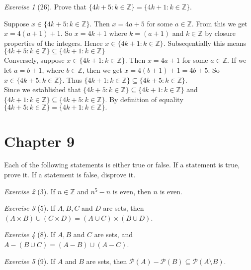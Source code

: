 \documentclass[12pt]{amsart}
\makeatletter
\theoremstyle{remark}
\newtheorem*{exercise}{Exercise}%
\def\ZZ{\ensuremath{\mathbb Z}}
\newcommand{\mc}[1]{\ensuremath{\mathcal{#1}}} %
\renewenvironment{proof}[1][\proofname]{\par\doublespacing
  \pushQED{\qed}%
  \normalfont \topsep6\p@\@plus6\p@\relax
  \list{}{%
    \settowidth{\leftmargin}{\itshape\proofname:\hskip\labelsep}%
    \setlength{\labelwidth}{0pt}%
    \setlength{\itemindent}{-\leftmargin}%
  }%
  \item[\hskip\labelsep\itshape#1\@addpunct{:}]\ignorespaces
}{%
  \popQED\endlist\@endpefalse
  \singlespacing
}
\theoremstyle{mycomment}
\makeatother
\begin{document}
\begin{exercise}[26] Prove that $\{4k+5:k\in\ZZ\}=\{4k+1:k\in\ZZ\}$.
\begin{proof}%
Suppose $x \in \{4k + 5: k \in \ZZ\}$. Then $x = 4a + 5$ for some $a \in \ZZ$. From this we get $x = 4(a + 1) + 1$. So $x = 4k + 1$ where $k = (a + 1)$ and $k \in \ZZ$ by closure properties of the integers. Hence $x \in \{4k+1:k\in\ZZ\}$. Subseqentially this means $\{4k + 5:k \in \ZZ\} \subseteq \{4k+1:k\in\ZZ\}$ \\
Conversely, suppose $x \in \{4k+1:k\in\ZZ\}$. Then $x = 4a + 1$ for some $a \in \ZZ$. If we let $a = b+1$, where $b \in \ZZ$, then we get $x = 4(b+1) + 1 = 4b + 5$. So $x \in \{4k+5:k\in\ZZ\}$. Thus $\{4k+1:k\in\ZZ\} \subseteq \{4k+5:k\in\ZZ\}$. \\
Since we established that $\{4k+5:k\in\ZZ\} \subseteq \{4k+1:k\in\ZZ\}$ and $\{4k + 1: k \in \ZZ\} \subseteq \{4k+5: k \in \ZZ \}$. By definition of equality $\{4k+5:k\in\ZZ\}=\{4k+1:k\in\ZZ\}.$
\end{proof}
\end{exercise}
\section*{Chapter 9}

Each of the following statements is either true or false. If a statement is true, prove
it. If a statement is false, disprove it. 
\begin{exercise}[3] If $n\in \ZZ$ and $n^{5}-n$ is even, then $n$ is even.
\begin{proof}%

\end{proof}
\end{exercise}

\begin{exercise}[5] If $A, B, C$ and $D$ are sets, then $(A\times B)\cup(C\times D)=(A\cup C)\times (B\cup D)$.
\begin{proof}%
\end{proof}
\end{exercise}

\begin{exercise}[8] If $A, B$ and $C$ are sets, and $A-(B\cup C)=(A-B)\cup (A-C)$.
\begin{proof}%
\end{proof}
\end{exercise}

\begin{exercise}[9] If $A$ and $B$ are sets, then $\mc P(A)-\mc P(B)\subseteq \mc P(A\setminus B)$.
\begin{proof}%
\end{proof}
\end{exercise}
\end{document}
